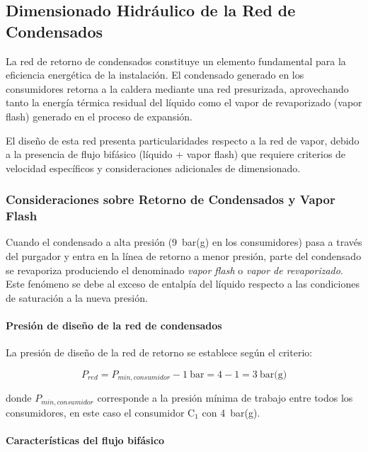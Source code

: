\subsection{Dimensionado Hidráulico de la Red de Condensados}
\label{subsec:dimensionado-condensados}

La red de retorno de condensados constituye un elemento fundamental para la eficiencia energética de la instalación. El condensado generado en los consumidores retorna a la caldera mediante una red presurizada, aprovechando tanto la energía térmica residual del líquido como el vapor de revaporizado (vapor flash) generado en el proceso de expansión.

El diseño de esta red presenta particularidades respecto a la red de vapor, debido a la presencia de flujo bifásico (líquido + vapor flash) que requiere criterios de velocidad específicos y consideraciones adicionales de dimensionado.

\subsubsection{Consideraciones sobre Retorno de Condensados y Vapor Flash}
\label{subsubsec:consideraciones-condensados}

Cuando el condensado a alta presión (9~bar(g) en los consumidores) pasa a través del purgador y entra en la línea de retorno a menor presión, parte del condensado se revaporiza produciendo el denominado \textit{vapor flash} o \textit{vapor de revaporizado}. Este fenómeno se debe al exceso de entalpía del líquido respecto a las condiciones de saturación a la nueva presión.

\paragraph{Presión de diseño de la red de condensados}

La presión de diseño de la red de retorno se establece según el criterio:

\begin{equation}
	P_{red} = P_{min,consumidor} - 1~\text{bar} = 4 - 1 = 3~\text{bar(g)}
	\label{eq:presion-red-condensados}
\end{equation}

donde $P_{min,consumidor}$ corresponde a la presión mínima de trabajo entre todos los consumidores, en este caso el consumidor C$_1$ con 4~bar(g).

\paragraph{Características del flujo bifásico}

